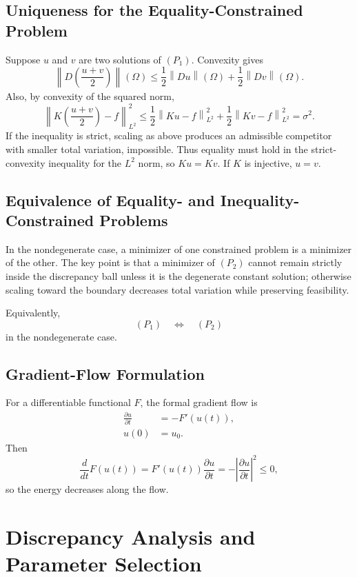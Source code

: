 \documentclass[11pt]{article}
\newcommand{\Om}{\Omega}
\newcommand{\norm}[2][]{\left\lVert #2\right\rVert_{#1}}
\theoremstyle{definition}
\theoremstyle{plain}
\begin{document}
\subsection{Uniqueness for the Equality-Constrained Problem}
Suppose $u$ and $v$ are two solutions of $(P_1)$. Convexity gives
\[
\norm{D\left(\frac{u+v}{2}\right)}(\Om)
\le \frac12\norm{Du}(\Om)+\frac12\norm{Dv}(\Om).
\]
Also, by convexity of the squared norm,
\[
\norm[L^2]{K\left(\frac{u+v}{2}\right)-f}^2
\le \frac12\norm[L^2]{Ku-f}^2+
\frac12\norm[L^2]{Kv-f}^2
=\sigma^2.
\]
If the inequality is strict, scaling as above produces an admissible competitor with smaller total variation, impossible. Thus equality must hold in the strict-convexity inequality for the $L^2$ norm, so $Ku=Kv$. If $K$ is injective, $u=v$.

\subsection{Equivalence of Equality- and Inequality-Constrained Problems}
In the nondegenerate case, a minimizer of one constrained problem is a minimizer of the other. The key point is that a minimizer of $(P_2)$ cannot remain strictly inside the discrepancy ball unless it is the degenerate constant solution; otherwise scaling toward the boundary decreases total variation while preserving feasibility.

Equivalently,
\[
(P_1)\quad\Longleftrightarrow\quad(P_2)
\]
in the nondegenerate case.

\subsection{Gradient-Flow Formulation}
For a differentiable functional $F$, the formal gradient flow is
\begin{align*}
\frac{\partial u}{\partial t} &=-F'(u(t)),\\
u(0) &=u_0.
\end{align*}
Then
\[
\frac{d}{dt}F(u(t))
=F'(u(t))\frac{\partial u}{\partial t}
=-\left|\frac{\partial u}{\partial t}\right|^2\le0,
\]
so the energy decreases along the flow.

\section{Discrepancy Analysis and Parameter Selection}
\end{document}
